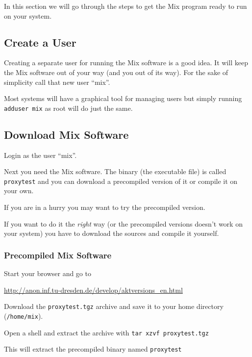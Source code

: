 \documentclass{article}
\begin{document}
In this section we will go through the steps to get the Mix program ready
to run on your system. 


\subsection{Create a User}

Creating a separate user for running the Mix software is a good idea.
It will keep the Mix software out of your way (and you out of its
way). For the sake of simplicity call that new user ``mix''.

Most systems will have a graphical tool for managing users but simply
running \verb|adduser mix| as root will do just the same.


\subsection{Download Mix Software}

Login as the user ``mix''.

Next you need the Mix software. The binary (the
executable file) is called \verb|proxytest| and you can download a
precompiled version of it or compile it on your own.

If you are in a hurry you may want to try the precompiled version. 

If you want to do it the \emph{right} way (or the precompiled versions
doesn't work on your system) you have to download the sources and compile it
yourself.


\subsubsection{Precompiled Mix Software}
\label{precompiled}
Start your browser and go to

\url{http://anon.inf.tu-dresden.de/develop/aktversions_en.html}

Download the \verb|proxytest.tgz| archive and save it to your home directory (\texttt{/home/mix}).

Open a shell and extract the archive with \verb|tar xzvf proxytest.tgz|

This will extract the precompiled binary named \verb|proxytest|
\end{document}
